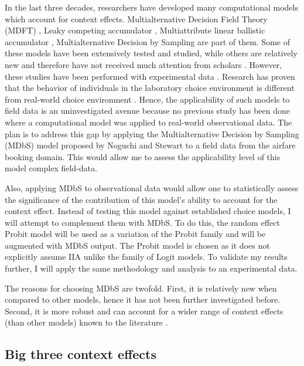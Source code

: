 \documentclass[a4paper,12pt]{article}
\newcommand{\citeyearonly}[1]{\citeyearpar{#1}}
\begin{document}
In the last three decades, researchers have developed many computational models which account for context effects. Multialternative Decision Field Theory (MDFT) \citep{roe2001multialternative}, Leaky competing
accumulator \citep{usher2001time}, Multiattribute linear ballistic accumulator \citep{trueblood2014multiattribute}, Multialternative Decision by Sampling  \citep{noguchi2018multialternative} are part of them. Some of these models have been extensively tested and studied, while others are relatively new and therefore have not received much attention from scholars \citep{truebloodEtAl13}. However, these studies have been performed with experimental data \citep{trueblood2014multiattribute,  berkowitsch2014rigorously, evans2019response, busemeyer2019cognitive}. Research has proven that the behavior of individuals in the laboratory choice environment is different from real-world choice environment \citep{hogarth1989risk}. Hence, the applicability of such models to field data is an uninvestigated avenue because no previous study has been done where a computational model was applied to real-world observational data. The plan is to address this gap by applying the Multialternative Decision by Sampling (MDbS) model proposed by Noguchi and Stewart \citeyearonly{noguchi2018multialternative} to a field data from the airfare booking domain. This would allow me to assess the applicability level of this model complex field-data. 

Also, applying MDbS to observational data would allow one to statistically assess the significance of the contribution of this model's ability to account for the context effect. Instead of testing this model against established choice models, I will attempt to complement them with MDbS. To do this, the random effect Probit model will be used as a variation of the Probit family and will be augmented with MDbS output. The Probit model is chosen as it does not explicitly assume IIA unlike the family of Logit models. To validate my results further, I will apply the same methodology and analysis to an experimental data.

The reasons for choosing MDbS are twofold. First, it is relatively new when compared to other models, hence it has not been further investigated before. Second, it is more robust and can account for a wider range of context effects (than other models) known to the literature \citep{noguchi2018multialternative}.


\subsection{Big three context effects}\label{chapter:bigThreeContextEffectsDescription}
\end{document}
